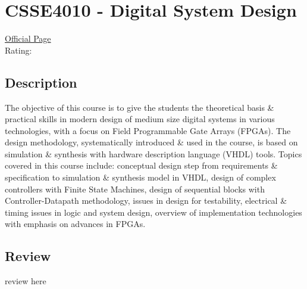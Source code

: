 \hypertarget{CSSE4010}{\section{CSSE4010 - Digital System Design}}

\large
\textcolor{turbo_purple}{\href{https://my.uq.edu.au/programs-courses/course.html?course_code=CSSE4010}{Official Page}} \\
Rating: \cstar\cstar\cstar\cstar\ostar

\normalsize
\subsection*{Description}
The objective of this course is to give the students the theoretical basis \& practical skills in modern design of medium size digital systems in various technologies, with a focus on Field Programmable Gate Arrays (FPGAs).
The design methodology, systematically introduced \& used in the course, is based on simulation \& synthesis with hardware description language (VHDL) tools.
Topics covered in this course include: conceptual design step from requirements \& specification to simulation \& synthesis model in VHDL, design of complex controllers with Finite State Machines, design of sequential blocks with Controller-Datapath methodology, issues in design for testability, electrical \& timing issues in logic and system design, overview of implementation technologies with emphasis on advances in FPGAs.

\subsection*{Review}
review here
